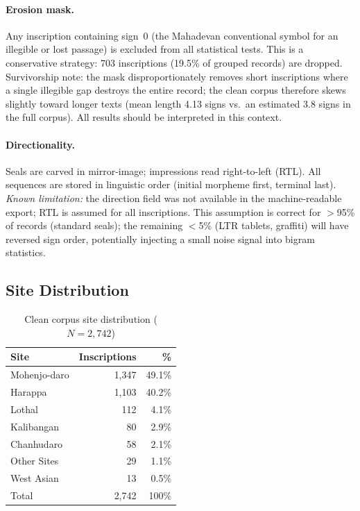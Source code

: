 \documentclass[12pt,letterpaper]{article}
\begin{document}
\paragraph{Erosion mask.}
Any inscription containing sign~0 (the Mahadevan conventional symbol for
an illegible or lost passage) is excluded from all statistical tests.
This is a conservative strategy: 703 inscriptions (19.5\% of grouped
records) are dropped.
Survivorship note: the mask disproportionately removes short inscriptions
where a single illegible gap destroys the entire record; the clean corpus
therefore skews slightly toward longer texts (mean length 4.13 signs vs.\
an estimated 3.8 signs in the full corpus).
All results should be interpreted in this context.

\paragraph{Directionality.}
Seals are carved in mirror-image; impressions read right-to-left (RTL).
All sequences are stored in linguistic order (initial morpheme first,
terminal last).
\emph{Known limitation:} the direction field was not available in the
machine-readable export; RTL is assumed for all inscriptions.
This assumption is correct for $>$95\% of records (standard seals);
the remaining $<$5\% (LTR tablets, graffiti) will have reversed sign
order, potentially injecting a small noise signal into bigram statistics.

\subsection{Site Distribution}

\begin{table}[htbp]
\centering
\caption{Clean corpus site distribution ($N = 2{,}742$)}
\label{tab:sites}
\begin{tabular}{lrr}
\toprule
Site & Inscriptions & \% \\
\midrule
Mohenjo-daro  & 1,347 & 49.1\% \\
Harappa       & 1,103 & 40.2\% \\
Lothal        &   112 &  4.1\% \\
Kalibangan    &    80 &  2.9\% \\
Chanhudaro    &    58 &  2.1\% \\
Other Sites   &    29 &  1.1\% \\
West Asian    &    13 &  0.5\% \\
\midrule
Total         & 2,742 & 100\%  \\
\bottomrule
\end{tabular}
\end{table}
\end{document}
